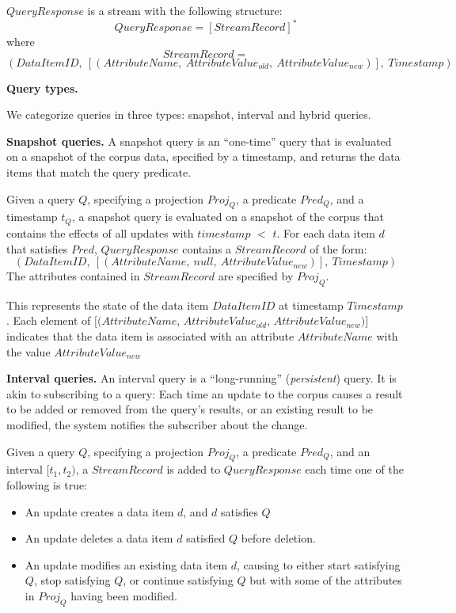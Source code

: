 \noindent
$QueryResponse$ is a stream with the following structure:
\[
  QueryResponse = [StreamRecord]^*
\]
where
\[
  StreamRecord =
\]
\[
  (DataItemID,~[(AttributeName,~AttributeValue_{old},~AttributeValue_{new})],~Timestamp)
\]


\bigskip
\noindent
\textbf{Query types.}

\noindent
We categorize queries in three types: snapshot, interval and hybrid queries.

\medskip
\noindent
\textbf{Snapshot queries.}
A snapshot query is an ``one-time'' query that is evaluated on a snapshot of the corpus data,
specified by a timestamp, and returns the data items that match the query predicate.

Given a query $Q$,
specifying a projection $Proj_Q$, a predicate $Pred_Q$, and a timestamp $t_Q$,
a snapshot query is evaluated on a snapshot of the corpus that contains the effects of all updates with
$timestamp$ $<$ $t$.
For each data item $d$ that satisfies $Pred$, $QueryResponse$ contains a $StreamRecord$ of the form:
\[
(DataItemID,~[(AttributeName,~null,~AttributeValue_{new})],~Timestamp)
\]
The attributes contained in $StreamRecord$ are specified by $Proj_Q$.

This represents the state of the data item $DataItemID$ at timestamp $Timestamp$.
Each element of $[(AttributeName$, $AttributeValue_{old}$, $AttributeValue_{new})]$ indicates that
the data item is associated with an attribute $AttributeName$ with the value $AttributeValue_{new}$

\medskip
\noindent
\textbf{Interval queries.}
An interval query is a ``long-running'' (\textit{persistent}) query.
It is akin to subscribing to a query:
Each time an update to the corpus causes a result to be added or removed from the query's results,
or an existing result to be modified,
the system notifies the subscriber about the change.

\begin{sloppypar}
Given a query $Q$,
specifying a projection $Proj_Q$, a predicate $Pred_Q$, and an interval $[t_1, t_2)$,
a $StreamRecord$ is added to $QueryResponse$ each time one of the following is true:
\end{sloppypar}
\begin{itemize}
\item An update creates a data item $d$, and $d$ satisfies $Q$

\item An update deletes a data item $d$ satisfied $Q$ before deletion.

\item An update modifies an existing data item $d$,
causing to either start satisfying $Q$, stop satisfying $Q$,
or continue satisfying $Q$ but with some of the attributes in $Proj_Q$ having been modified.
\end{itemize}

